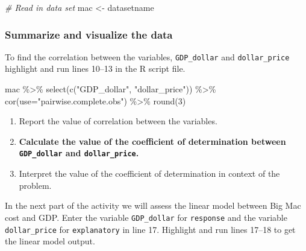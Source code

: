 \documentclass[
]{report}
\newenvironment{Shaded}{\begin{snugshade}}{\end{snugshade}}
\newcommand{\AttributeTok}[1]{\textcolor[rgb]{0.77,0.63,0.00}{#1}}
\newcommand{\CommentTok}[1]{\textcolor[rgb]{0.56,0.35,0.01}{\textit{#1}}}
\newcommand{\DecValTok}[1]{\textcolor[rgb]{0.00,0.00,0.81}{#1}}
\newcommand{\FunctionTok}[1]{\textcolor[rgb]{0.00,0.00,0.00}{#1}}
\newcommand{\NormalTok}[1]{#1}
\newcommand{\OtherTok}[1]{\textcolor[rgb]{0.56,0.35,0.01}{#1}}
\newcommand{\SpecialCharTok}[1]{\textcolor[rgb]{0.00,0.00,0.00}{#1}}
\newcommand{\StringTok}[1]{\textcolor[rgb]{0.31,0.60,0.02}{#1}}
\begin{document}
\begin{Shaded}
\begin{Highlighting}[]
\CommentTok{\# Read in data set }
\NormalTok{mac }\OtherTok{\textless{}{-}}\NormalTok{ datasetname}
\end{Highlighting}
\end{Shaded}

\hypertarget{summarize-and-visualize-the-data-6}{%
\subsubsection*{Summarize and visualize the data}\label{summarize-and-visualize-the-data-6}}

To find the correlation between the variables, \texttt{GDP\_dollar} and \texttt{dollar\_price} highlight and run lines 10--13 in the R script file.

\begin{Shaded}
\begin{Highlighting}[]
\NormalTok{mac }\SpecialCharTok{\%\textgreater{}\%} 
  \FunctionTok{select}\NormalTok{(}\FunctionTok{c}\NormalTok{(}\StringTok{"GDP\_dollar"}\NormalTok{, }\StringTok{"dollar\_price"}\NormalTok{)) }\SpecialCharTok{\%\textgreater{}\%}
  \FunctionTok{cor}\NormalTok{(}\AttributeTok{use=}\StringTok{"pairwise.complete.obs"}\NormalTok{) }\SpecialCharTok{\%\textgreater{}\%}
  \FunctionTok{round}\NormalTok{(}\DecValTok{3}\NormalTok{)}
\end{Highlighting}
\end{Shaded}

\begin{enumerate}
\def\labelenumi{\arabic{enumi}.}
\item
  Report the value of correlation between the variables.
  \vspace{0.2in}
\item
  \textbf{Calculate the value of the coefficient of determination between \texttt{GDP\_dollar} and \texttt{dollar\_price}.}
  \vspace{0.4in}
\item
  Interpret the value of the coefficient of determination in context of the problem.
  \vspace{0.6in}
\end{enumerate}

In the next part of the activity we will assess the linear model between Big Mac cost and GDP. Enter the variable \texttt{GDP\_dollar} for \texttt{response} and the variable \texttt{dollar\_price} for \texttt{explanatory} in line 17. Highlight and run lines 17--18 to get the linear model output.
\end{document}
